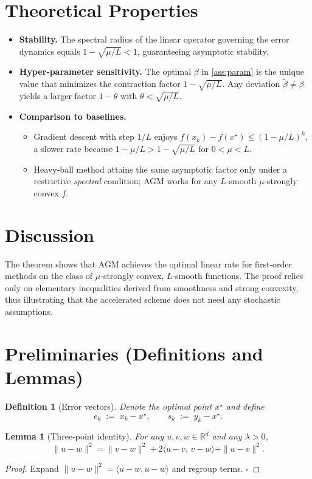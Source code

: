\documentclass{article}
\newtheorem{lemma}{Lemma}
\newtheorem{definition}{Definition}
\newcommand{\R}{\mathbb{R}}
\begin{document}
\section*{Theoretical Properties}
\begin{itemize}
\item \textbf{Stability.} The spectral radius of the linear operator governing the error dynamics equals $1-\sqrt{\mu/L}<1$, guaranteeing asymptotic stability.
\item \textbf{Hyper‑parameter sensitivity.} The optimal $\beta$ in \eqref{ass:param} is the unique value that minimizes the contraction factor $1-\sqrt{\mu/L}$. Any deviation $\tilde\beta\neq\beta$ yields a larger factor $1-\theta$ with $\theta<\sqrt{\mu/L}$.
\item \textbf{Comparison to baselines.}
    \begin{itemize}
        \item Gradient descent with step $1/L$ enjoys $f(x_{k})-f(x^{\star})\le (1-\mu/L)^{k}$, a slower rate because $1-\mu/L > 1-\sqrt{\mu/L}$ for $0<\mu<L$.
        \item Heavy‑ball method attains the same asymptotic factor only under a restrictive \emph{spectral} condition; AGM works for any $L$‑smooth $\mu$‑strongly convex $f$.
    \end{itemize}
\end{itemize}

\section*{Discussion}
The theorem shows that AGM achieves the optimal linear rate for first‑order methods on the class of $\mu$‑strongly convex, $L$‑smooth functions. The proof relies only on elementary inequalities derived from smoothness and strong convexity, thus illustrating that the accelerated scheme does not need any stochastic assumptions.

\newpage
\section*{Preliminaries (Definitions and Lemmas)}
\begin{definition}[Error vectors]
Denote the optimal point $x^{\star}$ and define
\[
e_{k}\;:=\;x_{k}-x^{\star},\qquad
s_{k}\;:=\;y_{k}-x^{\star}.
\]
\end{definition}

\begin{lemma}[Three‑point identity]\label{lem:three}
For any $u,v,w\in\R^{d}$ and any $\lambda>0$,
\[
\|u-w\|^{2}= \|v-w\|^{2}+2\langle u-v,\,v-w\rangle+\|u-v\|^{2}.
\tag{L1}
\]
\end{lemma}
\begin{proof}
Expand $\|u-w\|^{2}=\langle u-w,u-w\rangle$ and regroup terms. \hfill $\square$
\end{proof}
\end{document}
